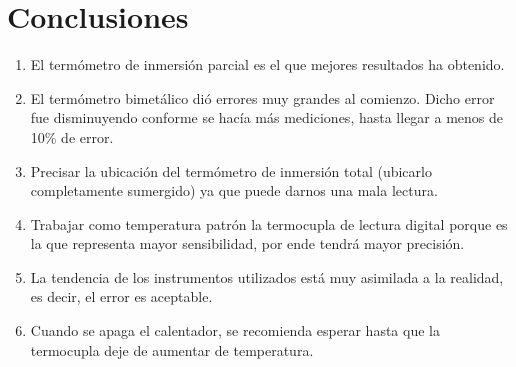 \documentclass[a4paper,11pt]{report}
\begin{document}
\chapter{Conclusiones}
\begin{enumerate}
\item El termómetro de inmersión parcial es el que mejores resultados ha obtenido.
\item El termómetro bimetálico dió errores muy grandes al comienzo. Dicho error fue disminuyendo conforme se hacía más mediciones, hasta llegar a menos de 10\% de error.
\item Precisar la ubicación del termómetro de inmersión total (ubicarlo completamente sumergido) ya que puede darnos una mala lectura.
\item Trabajar como temperatura patrón la termocupla de lectura digital porque es la que representa mayor sensibilidad, por ende tendrá mayor precisión. 
\item La tendencia de los instrumentos utilizados está muy asimilada a la realidad, es decir, el error es aceptable.
\item Cuando se apaga el calentador, se recomienda esperar hasta que la termocupla deje de aumentar de temperatura.
\end{enumerate}
\end{document}
